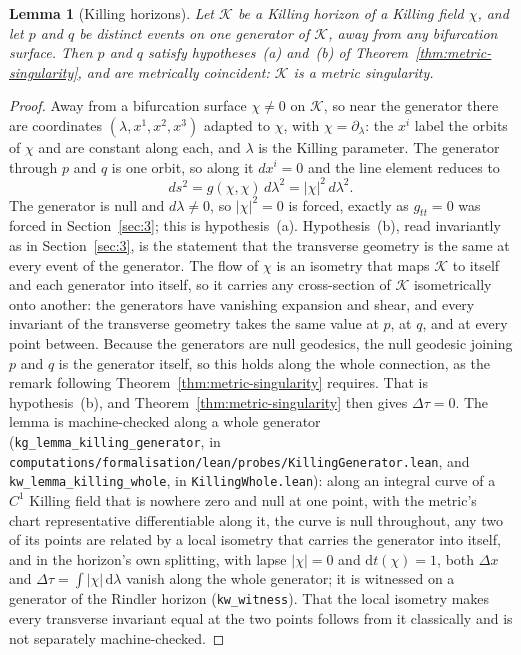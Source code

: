 \documentclass[11pt,a4paper]{article}
\theoremstyle{plain}
\newtheorem{lemma}{Lemma}
\theoremstyle{remark}
\begin{document}
\begin{lemma}[Killing horizons]\label{lem:killing}
Let $\mathcal{K}$ be a Killing horizon of a Killing field $\chi$, and let $p$ and $q$ be distinct events on one generator of $\mathcal{K}$, away from any bifurcation surface. Then $p$ and $q$ satisfy hypotheses~(a) and~(b) of Theorem~\ref{thm:metric-singularity}, and are metrically coincident: $\mathcal{K}$ is a metric singularity.
\end{lemma}

\begin{proof}
Away from a bifurcation surface $\chi\neq0$ on $\mathcal{K}$, so near the generator there are coordinates $(\lambda,x^{1},x^{2},x^{3})$ adapted to $\chi$, with $\chi=\partial_\lambda$: the $x^{i}$ label the orbits of $\chi$ and are constant along each, and $\lambda$ is the Killing parameter. The generator through $p$ and $q$ is one orbit, so along it $dx^{i}=0$ and the line element reduces to
\[
ds^{2}=g(\chi,\chi)\,d\lambda^{2}=|\chi|^{2}\,d\lambda^{2}.
\]
The generator is null and $d\lambda\neq0$, so $|\chi|^{2}=0$ is forced, exactly as $g_{tt}=0$ was forced in Section~\ref{sec:3}; this is hypothesis~(a). Hypothesis~(b), read invariantly as in Section~\ref{sec:3}, is the statement that the transverse geometry is the same at every event of the generator. The flow of $\chi$ is an isometry that maps $\mathcal{K}$ to itself and each generator into itself, so it carries any cross-section of $\mathcal{K}$ isometrically onto another: the generators have vanishing expansion and shear, and every invariant of the transverse geometry takes the same value at $p$, at $q$, and at every point between. Because the generators are null geodesics, the null geodesic joining $p$ and $q$ is the generator itself, so this holds along the whole connection, as the remark following Theorem~\ref{thm:metric-singularity} requires. That is hypothesis~(b), and Theorem~\ref{thm:metric-singularity} then gives $\Delta\tau=0$. The lemma is machine-checked along a whole generator (\texttt{kg\_lemma\_killing\_generator}, in \texttt{computations/formalisation/lean/probes/KillingGenerator.lean}, and \texttt{kw\_lemma\_killing\_whole}, in \texttt{KillingWhole.lean}): along an integral curve of a $C^{1}$ Killing field that is nowhere zero and null at one point, with the metric's chart representative differentiable along it, the curve is null throughout, any two of its points are related by a local isometry that carries the generator into itself, and in the horizon's own splitting, with lapse $|\chi|=0$ and $\mathrm{d}t(\chi)=1$, both $\Delta x$ and $\Delta\tau=\int|\chi|\,\mathrm{d}\lambda$ vanish along the whole generator; it is witnessed on a generator of the Rindler horizon (\texttt{kw\_witness}). That the local isometry makes every transverse invariant equal at the two points follows from it classically and is not separately machine-checked.
\end{proof}
\end{document}
